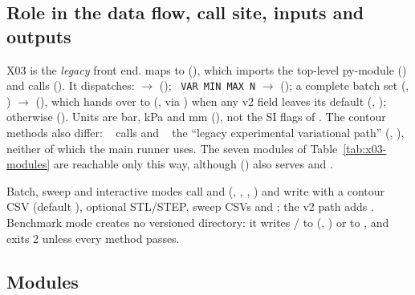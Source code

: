 \subsection{Role in the data flow, call site, inputs and outputs}

X03 is the \emph{legacy} front end.  maps to  (), which imports the top-level py-module  () and calls  (). It dispatches:  $\rightarrow$  (); ~\texttt{VAR MIN MAX N} $\rightarrow$  (); a complete batch set (, ) $\rightarrow$  (), which hands over to  (, via ) when any v2 field leaves its default (, ); otherwise  (). Units are bar, kPa and mm (), not the SI flags of . The contour methods also differ: ~ calls  and ~ the ``legacy experimental variational path''  (, ), neither of which the main runner uses. The seven modules of Table~\ref{tab:x03-modules} are reachable only this way, although  () also serves  and .

Batch, sweep and interactive modes call  and  (, , , ) and write  with a contour CSV (default ), optional STL/STEP, sweep CSVs and ; the v2 path adds . Benchmark mode creates no versioned directory: it writes / to  (, ) or to , and  exits 2 unless every method passes.

\subsection{Modules}

